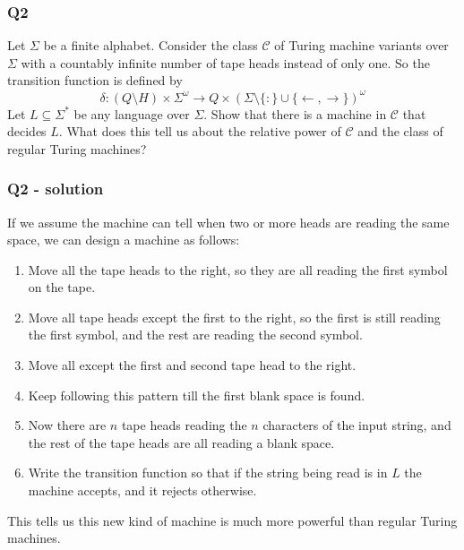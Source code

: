 \documentclass[handout]{beamer}
\newcommand{\ra}{\rightarrow}
\newcommand{\la}{\leftarrow}
\begin{document}
\begin{frame}
\frametitle{Q2}
Let $\Sigma$ be a finite alphabet. Consider the class $\mathcal C$ of Turing machine variants over $\Sigma$ with a countably infinite number of tape heads instead of only one. So the transition function is defined by \begin{equation*}\delta:(Q\setminus H)\times \Sigma^\omega \to Q\times(\Sigma\setminus\{:\}\cup \{\la,\ra\})^\omega \end{equation*}
Let $L\subseteq \Sigma^*$ be any language over $\Sigma$. Show that there is a machine in $\mathcal C$ that decides $L$. What does this tell us about the relative power of $\mathcal C$ and the class of regular Turing machines?
\end{frame}

\begin{frame}
\frametitle{Q2 - solution}
If we assume the machine can tell when two or more heads are reading the same space, we can design a machine as follows:
\begin{enumerate}
\item Move all the tape heads to the right, so they are all reading the first symbol on the tape.
\item Move all tape heads except the first to the right, so the first is still reading the first symbol, and the rest are reading the second symbol. 
\item Move all except the first and second tape head to the right.
\item Keep following this pattern till the first blank space is found.
\item Now there are $n$ tape heads reading the $n$ characters of the input string, and the rest of the tape heads are all reading a blank space.
\item Write the transition function so that if the string being read is in $L$ the machine accepts, and it rejects otherwise.
\end{enumerate}
This tells us this new kind of machine is much more powerful than regular Turing machines. 
\end{frame}
\end{document}

